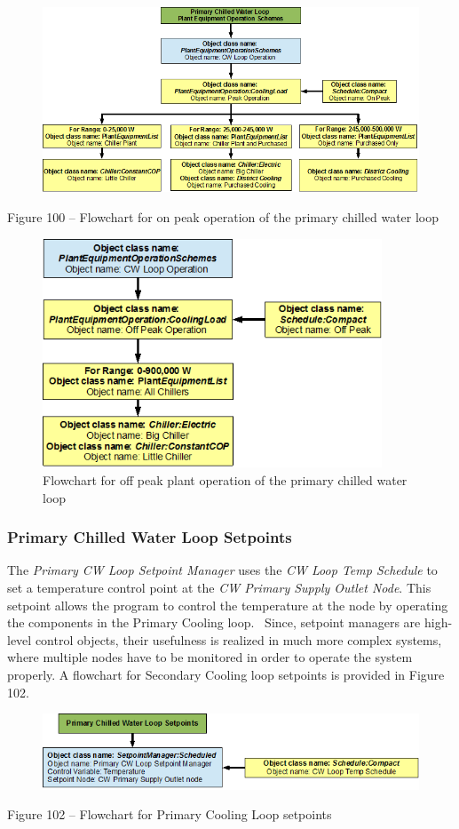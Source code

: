 \begin{figure}[htbp]
\centering
\includegraphics{media/image100.png}
\caption{}
\end{figure}

Figure 100 -- Flowchart for on peak operation of the primary chilled water loop

\begin{figure}[hbtp] %
\centering
\includegraphics[width=0.9\textwidth, height=0.9\textheight, keepaspectratio=true]{media/image101.png}
\caption{Flowchart for off peak plant operation of the primary chilled water loop \protect \label{fig:flowchart-for-off-peak-plant-operation-of}}
\end{figure}

\subsubsection{Primary Chilled Water Loop Setpoints}\label{primary-chilled-water-loop-setpoints}

The \emph{Primary CW Loop Setpoint Manager} uses the \emph{CW Loop Temp Schedule} to set a temperature control point at the \emph{CW Primary Supply Outlet Node}. This setpoint allows the program to control the temperature at the node by operating the components in the Primary Cooling loop. ~Since, setpoint managers are high-level control objects, their usefulness is realized in much more complex systems, where multiple nodes have to be monitored in order to operate the system properly. A flowchart for Secondary Cooling loop setpoints is provided in Figure 102.

\begin{figure}[htbp]
\centering
\includegraphics{media/image102.png}
\caption{}
\end{figure}

Figure 102 -- Flowchart for Primary Cooling Loop setpoints
